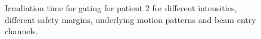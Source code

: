  \begin{figure}[H]
\caption{Irradiation time for gating for patient 2 for different intensities, different 
safety margins, underlying motion patterns and beam entry channels.}
\label{irrTime_gating_Pat024}
\end{figure}



\newpage

